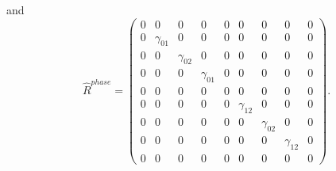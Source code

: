 and
\begin{equation}
\hat{R}^{phase}
=
\left(
\begin{array}{ccccccccc}
0 & 0 & 0 & 0 & 0 & 0 & 0 & 0 & 0 \\
0 & \gamma_{01} & 0 & 0 & 0 & 0 & 0 & 0 & 0 \\
0 & 0 & \gamma_{02} & 0 & 0 & 0 & 0 & 0 & 0 \\
0 & 0 & 0 & \gamma_{01} & 0 & 0 & 0 & 0 & 0 \\
0 & 0 & 0 & 0 & 0 & 0 & 0 & 0 & 0 \\
0 & 0 & 0 & 0 & 0 & \gamma_{12} & 0 & 0 & 0 \\
0 & 0 & 0 & 0 & 0 & 0 & \gamma_{02} & 0 & 0 \\
0 & 0 & 0 & 0 & 0 & 0 & 0 & \gamma_{12} & 0 \\
0 & 0 & 0 & 0 & 0 & 0 & 0 & 0 & 0 
\end{array}
\right).
\label{dephase3}
\end{equation}
